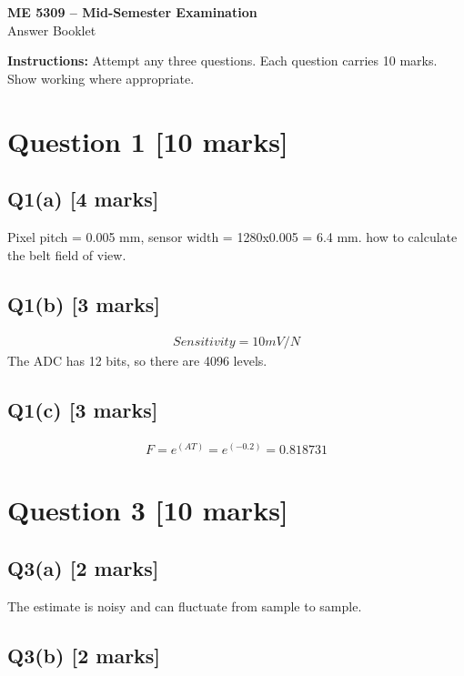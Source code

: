 \documentclass[11pt,a4paper]{article}
\begin{document}
\begin{center}
{\Large\bfseries ME 5309 -- Mid-Semester Examination}\\[3pt]
{\large Answer Booklet}\\[8pt]
\end{center}
\textbf{Instructions:} Attempt any three questions. Each question carries 10 marks. Show working where appropriate.
\section*{Question 1 \hfill [10 marks]}
\subsection*{Q1(a) \hfill [4 marks]}

Pixel pitch = 0.005 mm, sensor width = 1280x0.005 = 6.4 mm. how to calculate the belt field of view.

\subsection*{Q1(b) \hfill [3 marks]}

\[\begin{aligned}Sensitivity = 10 mV/N\end{aligned}\]
The ADC has 12 bits, so there are 4096 levels.

\subsection*{Q1(c) \hfill [3 marks]}

\[\begin{aligned}F = e^(AT) = e^(-0.2) = 0.818731\end{aligned}\]

\section*{Question 3 \hfill [10 marks]}
\subsection*{Q3(a) \hfill [2 marks]}

The estimate is noisy and can fluctuate from sample to sample.

\subsection*{Q3(b) \hfill [2 marks]}
\end{document}

